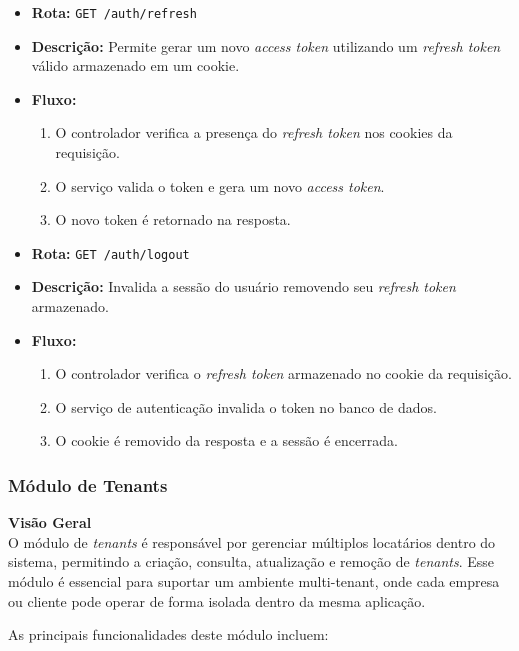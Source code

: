 \begin{itemize}
	\item \textbf{Rota:} \texttt{GET /auth/refresh}
	\item \textbf{Descrição:} Permite gerar um novo \textit{access token} utilizando um \textit{refresh token} válido armazenado em um cookie.
	\item \textbf{Fluxo:}
	\begin{enumerate}
		\item O controlador verifica a presença do \textit{refresh token} nos cookies da requisição.
		\item O serviço valida o token e gera um novo \textit{access token}.
		\item O novo token é retornado na resposta.
	\end{enumerate}
\end{itemize}

\begin{itemize}
	\item \textbf{Rota:} \texttt{GET /auth/logout}
	\item \textbf{Descrição:} Invalida a sessão do usuário removendo seu \textit{refresh token} armazenado.
	\item \textbf{Fluxo:}
	\begin{enumerate}
		\item O controlador verifica o \textit{refresh token} armazenado no cookie da requisição.
		\item O serviço de autenticação invalida o token no banco de dados.
		\item O cookie é removido da resposta e a sessão é encerrada.
	\end{enumerate}
\end{itemize}

\subsubsection{Módulo de Tenants}\label{subsubsec:modulo_tenants}

\textbf{Visão Geral} \\
O módulo de \textit{tenants} é responsável por gerenciar múltiplos locatários dentro do sistema, permitindo a criação, consulta, atualização e remoção de \textit{tenants}. Esse módulo é essencial para suportar um ambiente multi-tenant, onde cada empresa ou cliente pode operar de forma isolada dentro da mesma aplicação.

As principais funcionalidades deste módulo incluem:

